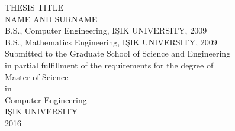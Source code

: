 \thispagestyle{empty}
\begin{center}
\vspace*{1cm}
\large{THESIS TITLE} 
\\[6cm] 
\large{NAME AND SURNAME} \\
\normalsize {
B.S., Computer Engineering, I\c{S}IK UNIVERSITY, 2009 \\
B.S., Mathematics Engineering, I\c{S}IK UNIVERSITY, 2009 \\[5cm]%
Submitted to the Graduate School of Science and Engineering \\
in partial fulfillment of the requirements for the degree of \\
Master of Science\\
in\\
Computer Engineering \\[3cm] 
I\c{S}IK UNIVERSITY \\
2016 }
\end{center}
